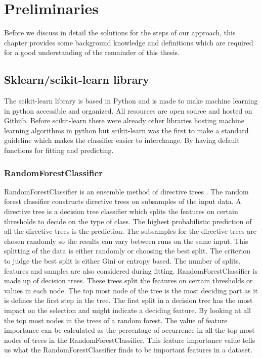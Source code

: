\documentclass[a4paper,10pt]{article}
\begin{document}
\newpage


\section{Preliminaries} \label{Chapter2}
Before we discuss in detail the solutions for the steps of our approach, this chapter provides
some background knowledge and definitions which are required for a good understanding of
the remainder of this thesis.
\subsection{Sklearn/scikit-learn library}
The scikit-learn library is based in Python and is made to make machine learning in python accessible and organized. 
All resources are open source and hosted on Github. Before scikit-learn there were already other libraries hosting machine learning algorithms in python but scikit-learn was the first to make a standard guideline which makes the classifier easier to interchange. By having default functions for fitting and predicting.


\subsubsection{RandomForestClassifier}
RandomForestClassifier is an ensemble method of directive trees \cite{RDF}. The random forest classifier constructs directive trees on subsamples of the input data.  A directive tree is a decision tree classifier which splits the features on certain thresholds to decide on the type of class. The highest probabilistic prediction of all the directive trees is the prediction. The subsamples for the directive trees are chosen randomly so the results can vary between runs on the same input. This splitting of the data is either randomly or choosing the best split. The criterion to judge the best split is either Gini or entropy based. The number of splits, features and samples are also considered during fitting. 
RandomForestClassifier is made up of decision trees. These trees split the features on certain thresholds or values in each node. The top most node of the tree is the most deciding part as it is defines the first step in the tree. The first split in a decision tree has the most impact on the selection and might indicate a deciding feature. By looking at all the top most nodes in the trees of a random forest. The value of feature importance can be calculated as the percentage of occurrence in all the top most nodes of trees in the RandomForestClassifier. This feature importance value tells us what the RandomForestClassifier finds to be important features in a dataset.
\end{document}
